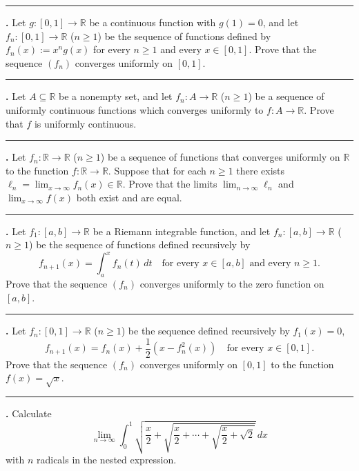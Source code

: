 \documentclass[11pt]{article}
\newcounter{probnum}
\newenvironment{problembox}{\par\noindent\rule{\linewidth}{0.5pt}\vspace{5pt}\par}{\vspace{2pt}}
\begin{document}
\begin{problembox}
\textbf{\theprobnum.} Let $g : [0,1] \to \mathbb{R}$ be a continuous function with $g(1) = 0$, and let $f_n : [0,1] \to \mathbb{R}$ ($n \ge 1$) be the sequence of functions defined by $f_n(x) := x^n g(x)$ for every $n \ge 1$ and every $x \in [0,1]$. Prove that the sequence $(f_n)$ converges uniformly on $[0,1]$.
\end{problembox}

\begin{problembox}
\textbf{\theprobnum.} Let $A \subseteq \mathbb{R}$ be a nonempty set, and let $f_n : A \to \mathbb{R}$ ($n \ge 1$) be a sequence of uniformly continuous functions which converges uniformly to $f : A \to \mathbb{R}$. Prove that $f$ is uniformly continuous.
\end{problembox}

\begin{problembox}
\textbf{\theprobnum.} Let $f_n : \mathbb{R} \to \mathbb{R}$ ($n \ge 1$) be a sequence of functions that converges uniformly on $\mathbb{R}$ to the function $f : \mathbb{R} \to \mathbb{R}$. Suppose that for each $n \ge 1$ there exists $\ell_n = \lim_{x \to \infty} f_n(x) \in \mathbb{R}$. Prove that the limits $\lim_{n \to \infty} \ell_n$ and $\lim_{x \to \infty} f(x)$ both exist and are equal.
\end{problembox}

\begin{problembox}
\textbf{\theprobnum.} Let $f_1 : [a,b] \to \mathbb{R}$ be a Riemann integrable function, and let $f_n : [a,b] \to \mathbb{R}$ ($n \ge 1$) be the sequence of functions defined recursively by
\[
f_{n+1}(x) = \int_a^x f_n(t)\,dt \quad \text{for every } x \in [a,b] \text{ and every } n \ge 1.
\]
Prove that the sequence $(f_n)$ converges uniformly to the zero function on $[a,b]$.
\end{problembox}

\begin{problembox}
\textbf{\theprobnum.} Let $f_n : [0,1] \to \mathbb{R}$ ($n \ge 1$) be the sequence defined recursively by $f_1(x) = 0$,
\[
f_{n+1}(x) = f_n(x) + \frac{1}{2}\left(x - f_n^2(x)\right) \quad \text{for every } x \in [0,1].
\]
Prove that the sequence $(f_n)$ converges uniformly on $[0,1]$ to the function $f(x) = \sqrt{x}$.
\end{problembox}

\begin{problembox}
\textbf{\theprobnum.} Calculate
\[
\lim_{n \to \infty} \int_0^1 \sqrt{\frac{x}{2} + \sqrt{\frac{x}{2} + \cdots + \sqrt{\frac{x}{2} + \sqrt{2}}}} \, dx
\]
with $n$ radicals in the nested expression.
\end{problembox}
\end{document}

